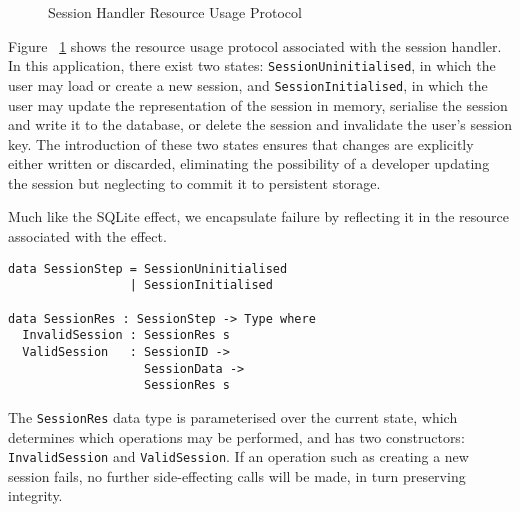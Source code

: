 \documentclass[preprint]{sigplanconf}
\begin{document}
\begin{figure}[htpb!]
\centering
{}
\caption{Session Handler Resource Usage Protocol}
\label{fig:sessionstates}
\end{figure}

Figure ~\ref{fig:sessionstates} shows the resource usage protocol associated with the session handler. In this application, there exist two states: \texttt{SessionUninitialised}, in which the user may load or create a new session, and \texttt{SessionInitialised}, in which the user may update the representation of the session in memory, serialise the session and write it to the database, or delete the session and invalidate the user's session key. The introduction of these two states ensures that changes are explicitly either written or discarded, eliminating the possibility of a developer updating the session but neglecting to commit it to persistent storage.

Much like the SQLite effect, we encapsulate failure by reflecting it in the resource associated with the effect. 
{\small
\begin{verbatim}
data SessionStep = SessionUninitialised
                 | SessionInitialised

data SessionRes : SessionStep -> Type where
  InvalidSession : SessionRes s  
  ValidSession   : SessionID -> 
                   SessionData -> 
                   SessionRes s
\end{verbatim}
}
The \texttt{SessionRes} data type is parameterised over the current state, which determines which operations may be performed, and has two constructors: \texttt{InvalidSession} and \texttt{ValidSession}. If an operation such as creating a new session fails, no further side-effecting calls will be made, in turn preserving integrity. 
\end{document}
